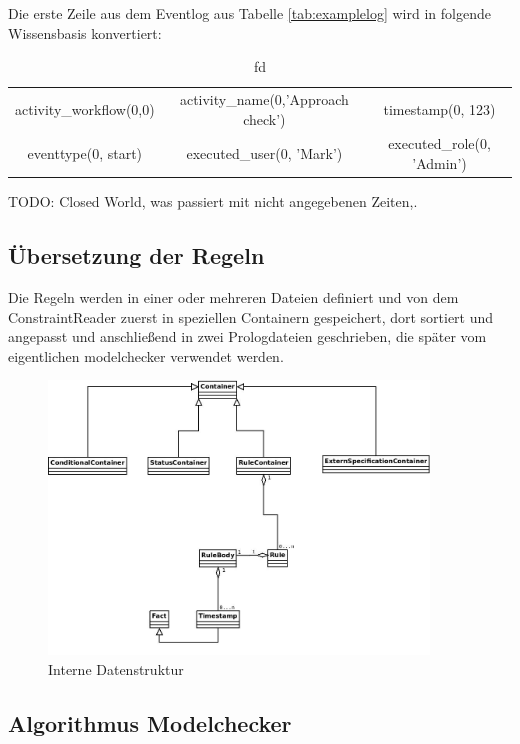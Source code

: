 Die erste Zeile aus dem Eventlog aus Tabelle \ref{tab:examplelog} wird in folgende Wissensbasis konvertiert:
\begin{table}[h]
\begin{tabular}{ccc}
activity{\_}workflow(0,0) & activity{\_}name(0,'Approach check') & timestamp(0, 123)\\ 
eventtype(0, start) & executed{\_}user(0, 'Mark') & executed{\_}role(0, 'Admin') 
\end{tabular}
\caption{fd}
\label{tab:knowledge}
\end{table}



TODO: Closed World, was passiert mit nicht angegebenen Zeiten,.

%
%
\subsection{Übersetzung der Regeln}
Die Regeln werden in einer oder mehreren Dateien definiert und von dem ConstraintReader zuerst in speziellen Containern gespeichert, dort sortiert und angepasst und anschließend in zwei Prologdateien geschrieben, die später vom eigentlichen modelchecker verwendet werden.

\begin{figure}[ht]
	\centering
  \includegraphics[width=0.9\textwidth]{Figures/Container}
	\caption{Interne Datenstruktur}
	\label{fig:container}
\end{figure}

%
%
\subsection{Algorithmus Modelchecker}


